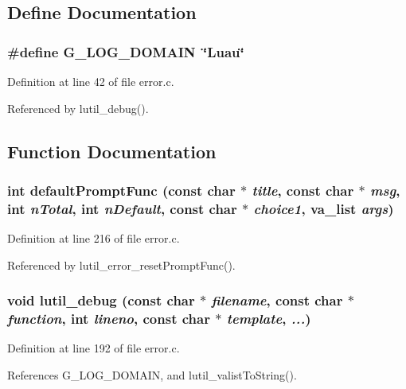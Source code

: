 \subsection{Define Documentation}
\subsubsection{\setlength{\rightskip}{0pt plus 5cm}\#define G\_\-LOG\_\-DOMAIN\ \char`\"{}Luau\char`\"{}}\label{error_8c_a0}




Definition at line 42 of file error.c.

Referenced by lutil\_\-debug().

\subsection{Function Documentation}
\subsubsection{\setlength{\rightskip}{0pt plus 5cm}int default\-Prompt\-Func (const char $\ast$ {\em title}, const char $\ast$ {\em msg}, int {\em n\-Total}, int {\em n\-Default}, const char $\ast$ {\em choice1}, va\_\-list {\em args})\hspace{0.3cm}{\tt  [static]}}\label{error_8c_a2}




Definition at line 216 of file error.c.

Referenced by lutil\_\-error\_\-reset\-Prompt\-Func().
\subsubsection{\setlength{\rightskip}{0pt plus 5cm}void lutil\_\-debug (const char $\ast$ {\em filename}, const char $\ast$ {\em function}, int {\em lineno}, const char $\ast$ {\em template},  {\em ...})}\label{error_8c_a8}




Definition at line 192 of file error.c.

References G\_\-LOG\_\-DOMAIN, and lutil\_\-valist\-To\-String().
